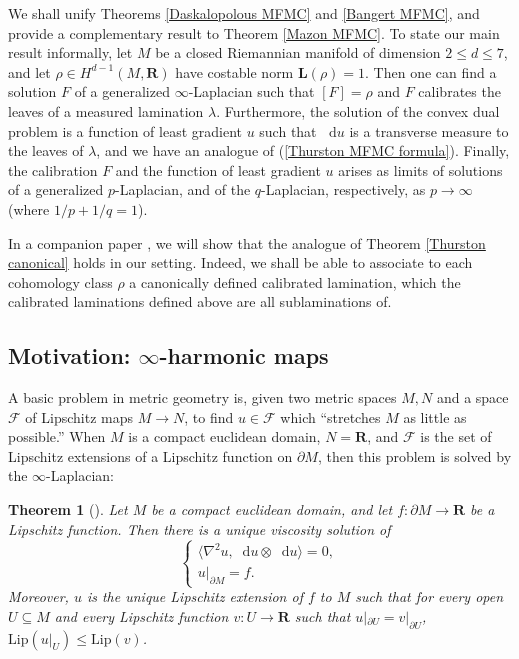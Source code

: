 \documentclass[reqno,11pt]{amsart}
\newcommand{\RR}{\mathbf{R}}
\newcommand*\dif{\mathop{}\!\mathrm{d}}
\newcommand{\Lip}{\mathrm{Lip}}
\newcommand{\Comass}{\mathbf L}
\newtheorem{theorem}{Theorem}[section]
\theoremstyle{definition}
\numberwithin{equation}{section}
\begin{document}
We shall unify Theorems \ref{Daskalopolous MFMC} and \ref{Bangert MFMC}, and provide a complementary result to Theorem \ref{Mazon MFMC}.
To state our main result informally, let $M$ be a closed Riemannian manifold of dimension $2 \leq d \leq 7$, and let $\rho \in H^{d - 1}(M, \RR)$ have costable norm $\Comass(\rho) = 1$.
Then one can find a solution $F$ of a generalized $\infty$-Laplacian such that $[F] = \rho$ and $F$ calibrates the leaves of a measured lamination $\lambda$.
Furthermore, the solution of the convex dual problem is a function of least gradient $u$ such that $\dif u$ is a transverse measure to the leaves of $\lambda$, and we have an analogue of (\ref{Thurston MFMC formula}).
Finally, the calibration $F$ and the function of least gradient $u$ arises as limits of solutions of a generalized $p$-Laplacian, and of the $q$-Laplacian, respectively, as $p \to \infty$ (where $1/p + 1/q = 1$).

In a companion paper \cite{BackusBest2}, we will show that the analogue of Theorem \ref{Thurston canonical} holds in our setting.
Indeed, we shall be able to associate to each cohomology class $\rho$ a canonically defined calibrated lamination, which the calibrated laminations defined above are all sublaminations of.

\subsection{Motivation: \texorpdfstring{$\infty$-harmonic}{infinity-harmonic} maps}
A basic problem in metric geometry is, given two metric spaces $M, N$ and a space $\mathscr F$ of Lipschitz maps $M \to N$, to find $u \in \mathscr F$ which ``stretches $M$ as little as possible.''
When $M$ is a compact euclidean domain, $N = \RR$, and $\mathscr F$ is the set of Lipschitz extensions of a Lipschitz function on $\partial M$, then this problem is solved by the $\infty$-Laplacian:

\begin{theorem}[{\cite{Crandall2008}}]\label{infinity Laplacian wellposedness}
Let $M$ be a compact euclidean domain, and let $f: \partial M \to \RR$ be a Lipschitz function.
Then there is a unique viscosity solution of 
$$\begin{cases}
	\langle \nabla^2 u, \dif u \otimes \dif u\rangle = 0, \\
	u|_{\partial M} = f.
\end{cases}$$
Moreover, $u$ is the unique Lipschitz extension of $f$ to $M$ such that for every open $U \subseteq M$ and every Lipschitz function $v: U \to \RR$ such that $u|_{\partial U} = v|_{\partial U}$, $\Lip(u|_U) \leq \Lip(v)$.
\end{theorem}
\end{document}
